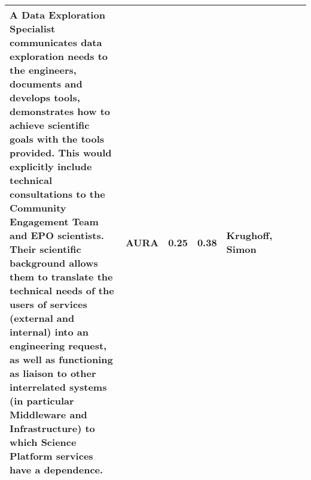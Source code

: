 \begin{longtable} {|l|p{}|p{}|p{}|l|l|l|l|}
{A Data Exploration Specialist communicates data exploration needs to the engineers, documents and develops tools, demonstrates how to achieve scientific goals with the tools provided. This would explicitly include technical consultations to the Community Engagement Team and EPO scientists. Their scientific background allows them to translate the technical needs of the users of services (external and internal) into an engineering request, as well as functioning as liaison to other interrelated systems (in particular Middleware and Infrastructure) to which Science Platform services have a dependence.}&{AURA}&{0.25}&{0.38}&{Krughoff, Simon} \\ \hline
\end{longtable} \normalsize
